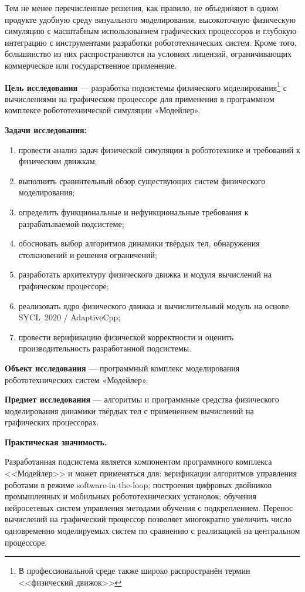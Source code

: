 Тем не менее перечисленные решения, как правило, не объединяют в одном продукте удобную среду визуального 
моделирования, высокоточную физическую симуляцию с масштабным использованием графических процессоров и 
глубокую интеграцию с инструментами разработки робототехнических систем. Кроме того, большинство из них 
распространяются на условиях лицензий, ограничивающих коммерческое или государственное применение.

\textbf{Цель исследования} --- разработка подсистемы физического моделирования\footnote{В профессиональной 
среде также широко распространён термин <<физический движок>>} с вычислениями на графическом процессоре для 
применения в программном комплексе робототехнической симуляции «Модейлер».

\textbf{Задачи исследования:}
\begin{enumerate}
  \item провести анализ задач физической симуляции в робототехнике и требований к физическим движкам;
  \item выполнить сравнительный обзор существующих систем физического моделирования;
  \item определить функциональные и нефункциональные требования к разрабатываемой подсистеме;
  \item обосновать выбор алгоритмов динамики твёрдых тел, обнаружения столкновений и решения ограничений;
  \item разработать архитектуру физического движка и модуля вычислений на графическом процессоре;
  \item реализовать ядро физического движка и вычислительный модуль на основе SYCL~2020 / AdaptiveCpp;
  \item провести верификацию физической корректности и оценить производительность разработанной подсистемы.
\end{enumerate}

\textbf{Объект исследования} --- программный комплекс моделирования робототехнических систем «Модейлер».

\textbf{Предмет исследования} --- алгоритмы и программные средства физического моделирования динамики твёрдых 
тел с применением вычислений на графических процессорах.

\textbf{Практическая значимость.}

Разработанная подсистема является компонентом программного комплекса <<Модейлер>> и может применяться для: 
верификации алгоритмов управления роботами в режиме software-in-the-loop; построения цифровых двойников 
промышленных и мобильных робототехнических установок; обучения нейросетевых систем управления методами 
обучения с подкреплением. Перенос вычислений на графический процессор позволяет многократно увеличить число 
одновременно моделируемых систем по сравнению с реализацией на центральном процессоре.

